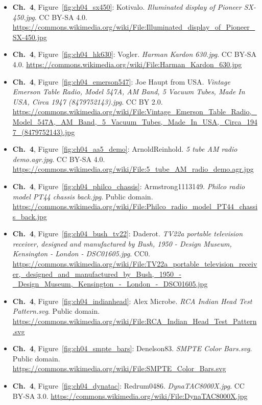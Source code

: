 \begin{small}
\begin{itemize}[leftmargin=0pt,itemsep=2pt,label={}]
\item \textbf{Ch.~4}, Figure~\ref{fig:ch04_sx450}: Kotivalo. \emph{Illuminated display of Pioneer SX-\allowbreak{}450.\allowbreak{}jpg}. CC BY-SA 4.0. \url{https://commons.wikimedia.org/wiki/File:Illuminated_display_of_Pioneer_SX-450.jpg}
\item \textbf{Ch.~4}, Figure~\ref{fig:ch04_hk630}: Vogler. \emph{Harman Kardon 630.\allowbreak{}jpg}. CC BY-SA 4.0. \url{https://commons.wikimedia.org/wiki/File:Harman_Kardon_630.jpg}
\item \textbf{Ch.~4}, Figure~\ref{fig:ch04_emerson547}: Joe Haupt from USA. \emph{Vintage Emerson Table Radio, Model 547A, AM Band, 5 Vacuum Tubes, Made In USA, Circa 1947 (8479752143).\allowbreak{}jpg}. CC BY 2.0. \url{https://commons.wikimedia.org/wiki/File:Vintage_Emerson_Table_Radio,_Model_547A,_AM_Band,_5_Vacuum_Tubes,_Made_In_USA,_Circa_1947_(8479752143).jpg}
\item \textbf{Ch.~4}, Figure~\ref{fig:ch04_aa5_demo}: ArnoldReinhold. \emph{5 tube AM radio demo.\allowbreak{}agr.\allowbreak{}jpg}. CC BY-SA 4.0. \url{https://commons.wikimedia.org/wiki/File:5_tube_AM_radio_demo.agr.jpg}
\item \textbf{Ch.~4}, Figure~\ref{fig:ch04_philco_chassis}: Armstrong1113149. \emph{Philco radio model PT44 chassis back.\allowbreak{}jpg}. Public domain. \url{https://commons.wikimedia.org/wiki/File:Philco_radio_model_PT44_chassis_back.jpg}
\item \textbf{Ch.~4}, Figure~\ref{fig:ch04_bush_tv22}: Daderot. \emph{TV22a portable television receiver, designed and manufactured by Bush, 1950 -\allowbreak{} Design Museum, Kensington -\allowbreak{} London -\allowbreak{} DSC01605.\allowbreak{}jpg}. CC0. \url{https://commons.wikimedia.org/wiki/File:TV22a_portable_television_receiver,_designed_and_manufactured_by_Bush,_1950_-_Design_Museum,_Kensington_-_London_-_DSC01605.jpg}
\item \textbf{Ch.~4}, Figure~\ref{fig:ch04_indianhead}: Alex Microbe. \emph{RCA Indian Head Test Pattern.\allowbreak{}svg}. Public domain. \url{https://commons.wikimedia.org/wiki/File:RCA_Indian_Head_Test_Pattern.svg}
\item \textbf{Ch.~4}, Figure~\ref{fig:ch04_smpte_bars}: Denelson83. \emph{SMPTE Color Bars.\allowbreak{}svg}. Public domain. \url{https://commons.wikimedia.org/wiki/File:SMPTE_Color_Bars.svg}
\item \textbf{Ch.~4}, Figure~\ref{fig:ch04_dynatac}: Redrum0486. \emph{DynaTAC8000X.\allowbreak{}jpg}. CC BY-SA 3.0. \url{https://commons.wikimedia.org/wiki/File:DynaTAC8000X.jpg}

\end{itemize}
\end{small}
